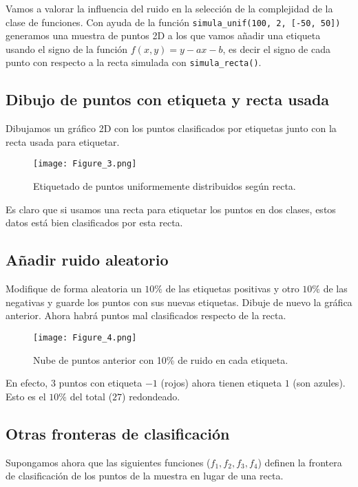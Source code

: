 Vamos a valorar la influencia del ruido en la selección de la complejidad de la
clase de funciones.  Con ayuda de la función
\texttt{simula_unif(100, 2, [-50, 50])} generamos una muestra de
puntos 2D a los que vamos añadir una etiqueta usando el signo de la función 
$f(x, y) = y - ax - b$, es decir el signo de cada punto con respecto a la
recta simulada con \texttt{simula_recta()}.  

\subsection{Dibujo de puntos con etiqueta y recta usada}

Dibujamos un gráfico 2D con los puntos clasificados por etiquetas junto
con la recta usada para etiquetar. 

\begin{figure}[H]
\centering
\texttt{[image: Figure\_3.png]}
\caption{Etiquetado de puntos uniformemente distribuidos según recta.}
\end{figure}

Es claro que si usamos una recta para etiquetar los puntos en dos clases,
estos datos está bien clasificados por esta recta.

\subsection{Añadir ruido aleatorio}

Modifique de forma aleatoria un $10\%$ de las etiquetas positivas y otro $10\%$
de las negativas y guarde los puntos con sus nuevas etiquetas. Dibuje de nuevo
la gráfica anterior. Ahora habrá puntos mal clasificados respecto de la recta.  

\begin{figure}[H]
\centering
\texttt{[image: Figure\_4.png]}
\caption{Nube de puntos anterior con 10\% de ruido en cada etiqueta.}
\end{figure}

En efecto, $3$ puntos con etiqueta $-1$ (rojos) ahora tienen etiqueta $1$
(son azules). Esto es el $10\%$ del total ($27$) redondeado.

\subsection{Otras fronteras de clasificación}

Supongamos ahora que las siguientes funciones ($f_1, f_2, f_3, f_4$)
definen la frontera de clasificación de los puntos de la muestra en 
lugar de una recta.


